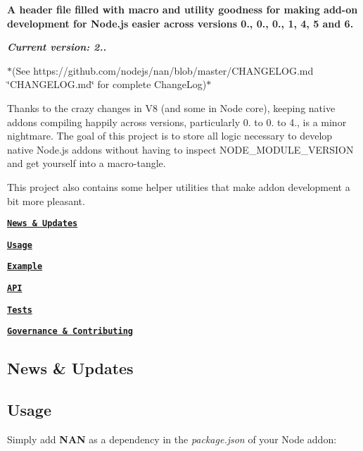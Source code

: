 {\bfseries A header file filled with macro and utility goodness for making add-\/on development for Node.\+js easier across versions 0., 0., 0., 1, 4, 5 and 6.}

{\itshape {\bfseries Current version\+: 2..}}

$\ast$(See https\+://github.com/nodejs/nan/blob/master/\+C\+H\+A\+N\+G\+E\+L\+O\+G.\+md \char`\"{}\+C\+H\+A\+N\+G\+E\+L\+O\+G.\+md\char`\"{} for complete Change\+Log)$\ast$

\href{https://nodei.co/npm/nan/}{\tt } \href{https://nodei.co/npm/nan/}{\tt }

\href{http://travis-ci.org/nodejs/nan}{\tt } \href{https://ci.appveyor.com/project/RodVagg/nan}{\tt }

Thanks to the crazy changes in V8 (and some in Node core), keeping native addons compiling happily across versions, particularly 0. to 0. to 4., is a minor nightmare. The goal of this project is to store all logic necessary to develop native Node.\+js addons without having to inspect {\ttfamily N\+O\+D\+E\+\_\+\+M\+O\+D\+U\+L\+E\+\_\+\+V\+E\+R\+S\+I\+ON} and get yourself into a macro-\/tangle.

This project also contains some helper utilities that make addon development a bit more pleasant.


\begin{DoxyItemize}
\item {\bfseries \href{#news}{\tt News \& Updates}}
\item {\bfseries \href{#usage}{\tt Usage}}
\item {\bfseries \href{#example}{\tt Example}}
\item {\bfseries \href{#api}{\tt A\+PI}}
\item {\bfseries \href{#tests}{\tt Tests}}
\item {\bfseries \href{#governance}{\tt Governance \& Contributing}}
\end{DoxyItemize}

\label{_news}%
 \subsection*{News \& Updates}

\label{_usage}%
 \subsection*{Usage}

Simply add {\bfseries N\+AN} as a dependency in the {\itshape package.\+json} of your Node addon\+:


